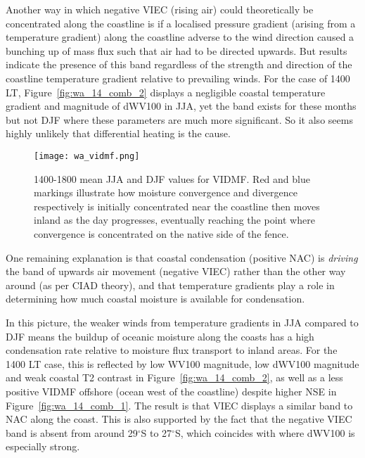 Another way in which negative \ac{VIEC} (rising air) could theoretically be concentrated along the coastline is if a localised pressure gradient (arising from a temperature gradient) along the coastline adverse to the wind direction caused a bunching up of mass flux such that air had to be directed upwards. But results indicate the presence of this band regardless of the strength and direction of the coastline temperature gradient relative to prevailing winds. For the case of 1400 \ac{LT}, Figure~\ref{fig:wa_14_comb_2} displays a negligible coastal temperature gradient and magnitude of \ac{dWV100} in \ac{JJA}, yet the band exists for these months but not \ac{DJF} where these parameters are much more significant. So it also seems highly unlikely that differential heating is the cause.

\begin{figure}[!ht]
	\centering
	\texttt{[image: wa\_vidmf.png]}
	\caption[WA 1400-1800 means for VIDMF]{1400-1800 mean \acs{JJA} and \acs{DJF} values for \acs{VIDMF}. Red and blue markings illustrate how moisture convergence and divergence respectively is initially concentrated near the coastline then moves inland as the day progresses, eventually reaching the point where convergence is concentrated on the native side of the fence.}
	\label{fig:wa_vidmf}
\end{figure}

One remaining explanation is that coastal condensation (positive \ac{NAC}) is \textit{driving} the band of upwards air movement (negative \ac{VIEC}) rather than the other way around (as per \ac{CIAD} theory), and that temperature gradients play a role in determining how much coastal moisture is available for condensation.

In this picture, the weaker winds from temperature gradients in \ac{JJA} compared to \ac{DJF} means the buildup of oceanic moisture along the coasts has a high condensation rate relative to moisture flux transport to inland areas. For the 1400 \ac{LT} case, this is reflected by low \ac{WV100} magnitude, low \ac{dWV100} magnitude and weak coastal \ac{T2} contrast in Figure~\ref{fig:wa_14_comb_2}, as well as a less positive \ac{VIDMF} offshore (ocean west of the coastline) despite higher \ac{NSE} in Figure~\ref{fig:wa_14_comb_1}. The result is that \ac{VIEC} displays a similar band to \ac{NAC} along the coast. This is also supported by the fact that the negative \ac{VIEC} band is absent from around 29$^\circ$S to 27$^\circ$S, which coincides with where \ac{dWV100} is especially strong.

